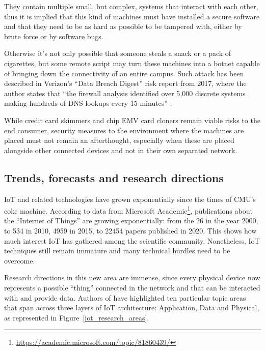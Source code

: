 		They contain multiple small, but complex, systems that interact with each other, thus it is implied that this kind of machines must have installed a secure software and that they need to be as hard as possible to be tampered with, either by brute force or by software bugs.
			
		Otherwise it's not only possible that someone steals a snack or a pack of cigarettes, but some remote script may turn these machines into a botnet capable of bringing down the connectivity of an entire campus.
		Such attack has been described in Verizon's ``Data Breach Digest'' risk report from 2017, where the author states that ``the firewall analysis identified over 5,000 discrete systems making hundreds of DNS lookups every 15 minutes'' \cite{DataBreachDigest}.
		
		While credit card skimmers and chip EMV card cloners remain viable risks to the end consumer, security measures to the environment where the machines are placed must not remain an afterthought, especially when these are placed alongside other connected devices and not in their own separated network.



	\subsection{Trends, forecasts and research directions}

		IoT and related technologies have grown exponentially since the times of CMU's coke machine.
		According to data from Microsoft Academic\footnote{\url{https://academic.microsoft.com/topic/81860439/}}, publications about the ``Internet of Things'' are growing exponentially: from the 26 in the year 2000, to 534 in 2010, 4959 in 2015, to 22454 papers published in 2020.
		This shows how much interest IoT has gathered among the scientific community. Nonetheless,
		IoT techniques still remain immature and many technical hurdles need to be overcome.

		Research directions in this new area are immense, since every physical device now represents a possible ``thing'' connected in the network and that can be interacted with and provide data.
		Authors of \cite{9319033} have highlighted ten particular topic areas that span across three layers of IoT architecture: Application, Data and Physical, as represented in Figure~\ref{iot_research_areas}.
	
